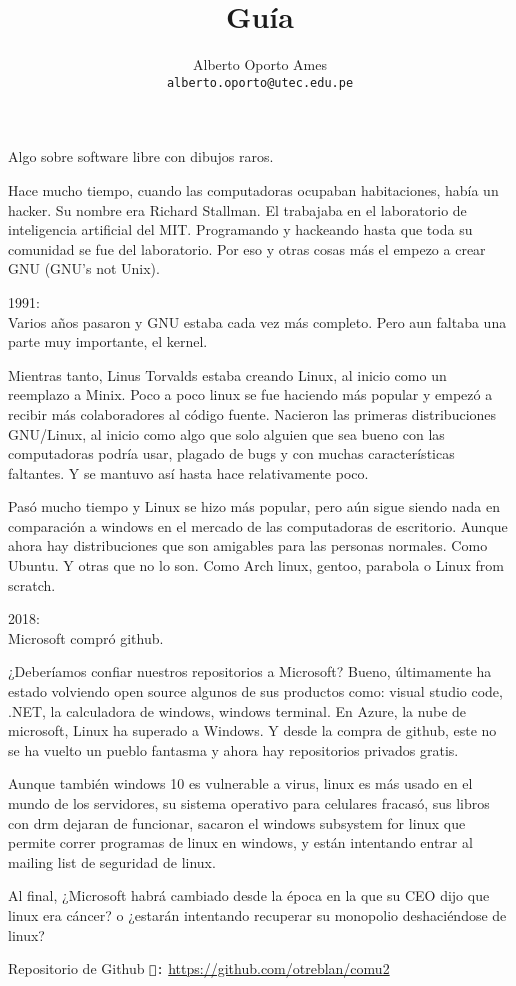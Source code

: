 \documentclass[12pt]{article}
\title{\textbf{Guía}}
\author{
		Alberto Oporto Ames\\
		\texttt{alberto.oporto@utec.edu.pe}
		}
\begin{document}
\maketitle
\thispagestyle{fancy}

Algo sobre software libre con dibujos raros.

Hace mucho tiempo, cuando las computadoras ocupaban habitaciones, había un hacker.
Su nombre era Richard Stallman.
El trabajaba en el laboratorio de inteligencia artificial del MIT.
Programando y hackeando hasta que toda su comunidad se fue del laboratorio.
Por eso y otras cosas más el empezo a crear GNU (GNU's not Unix).

1991:\\
Varios años pasaron y GNU estaba cada vez más completo.
Pero aun faltaba una parte muy importante, el kernel.

Mientras tanto, Linus Torvalds estaba creando Linux, al inicio como un reemplazo a Minix.
Poco a poco linux se fue haciendo más popular y empezó a recibir más colaboradores al código fuente.
Nacieron las primeras distribuciones GNU/Linux, al inicio como algo que solo alguien que sea bueno con las computadoras podría usar,
plagado de bugs y con muchas características faltantes.
Y se mantuvo así hasta hace relativamente poco.

Pasó mucho tiempo y Linux se hizo más popular,
pero aún sigue siendo nada en comparación a windows en el mercado de las computadoras de escritorio.
Aunque ahora hay distribuciones que son amigables para las personas normales.
Como Ubuntu.
Y otras que no lo son.
Como Arch linux, gentoo, parabola o Linux from scratch.

2018:\\
Microsoft compró github.

¿Deberíamos confiar nuestros repositorios a Microsoft?
Bueno, últimamente ha estado volviendo open source algunos de sus productos como: visual studio code, .NET, la calculadora de windows, windows terminal.
En Azure, la nube de microsoft, Linux ha superado a Windows.
Y desde la compra de github, este no se ha vuelto un pueblo fantasma y ahora hay repositorios privados gratis.

Aunque también windows 10 es vulnerable a virus,
linux es más usado en el mundo de los servidores,
su sistema operativo para celulares fracasó,
sus libros con drm dejaran de funcionar,
sacaron el windows subsystem for linux que permite correr programas de linux en windows,
y están intentando entrar al mailing list de seguridad de linux.

Al final, ¿Microsoft habrá cambiado desde la época en la que su CEO dijo que linux era cáncer?
o ¿estarán intentando recuperar su monopolio deshaciéndose de linux?

\vfill
Repositorio de Github \texttt{:} \url{https://github.com/otreblan/comu2}
\end{document}
